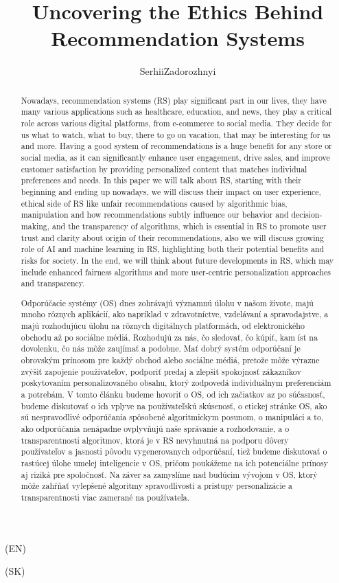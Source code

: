 \documentclass{article}
\title{Uncovering the Ethics Behind Recommendation Systems}
\author{Serhii\;Zadorozhnyi}
\begin{document}
\maketitle
\textbf{}
(EN)
\begin{abstract}
Nowadays, recommendation systems (RS) play significant part in our lives, they have many various applications such as healthcare, education, and news, they play a critical role across various digital platforms, from e-commerce to social media. They decide for us what to watch, what to buy, there to go on vacation, that may be interesting for us and more. Having a good system of recommendations is a huge benefit for any store or social media, as it can significantly enhance user engagement, drive sales, and improve customer satisfaction by providing personalized content that matches individual preferences and needs. In this paper we will talk about RS, starting with their beginning and ending up nowadays, we will discuss their impact on user experience, ethical side of RS like unfair recommendations caused by algorithmic bias, manipulation and how recommendations subtly influence our behavior and decision-making, and the transparency of algorithms, which is essential in RS to promote user trust and clarity about origin of their recommendations, also we will discuss growing role of AI and machine learning in RS, highlighting both their potential benefits and risks for society. In the end, we will think about future developments in RS, which may include enhanced fairness algorithms and more user-centric personalization approaches and transparency.
\end{abstract}
(SK)
\begin{abstract}
Odporúčacie systémy (OS) dnes zohrávajú významnú úlohu v našom živote, majú mnoho rôznych aplikácií, ako napríklad v zdravotníctve, vzdelávaní a spravodajstve, a majú rozhodujúcu úlohu na rôznych digitálnych platformách, od elektronického obchodu až po sociálne médiá. Rozhodujú za nás, čo sledovať, čo kúpiť, kam ísť na dovolenku, čo nás môže zaujímať a podobne. Mať dobrý systém odporúčaní je obrovským prínosom pre každý obchod alebo sociálne médiá, pretože môže výrazne zvýšiť zapojenie používateľov, podporiť predaj a zlepšiť spokojnosť zákazníkov poskytovaním personalizovaného obsahu, ktorý zodpovedá individuálnym preferenciám a potrebám. V tomto článku budeme hovoriť o OS, od ich začiatkov az po súčasnosť, budeme diskutovať o ich vplyve na používateľskú skúsenosť, o etickej stránke OS, ako sú nespravodlivé odporúčania spôsobené algoritmickym posunom, o manipuláci a to, ako odporúčania nenápadne ovplyvňujú naše správanie a rozhodovanie, a o transparentnosti algoritmov, ktorá je v RS nevyhnutná na podporu dôvery používateľov a jasnosti pôvodu vygenerovanych odporúčaní, tiež budeme diskutovať o rastúcej úlohe umelej inteligencie v OS, pričom poukážeme na ich potenciálne prínosy aj riziká pre spoločnosť. Na záver sa zamyslíme nad budúcim vývojom v OS, ktorý môže zahŕňať vylepšené algoritmy spravodlivosti a prístupy personalizácie a transparentnosti viac zamerané na používateľa.    
\end{abstract}
\end{document}
